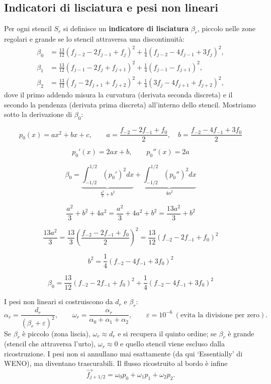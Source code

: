 \documentclass[12pt]{article}
\begin{document}
\newpage

\subsection{Indicatori di lisciatura e pesi non lineari}

Per ogni stencil $S_r$ si definisce un \textbf{indicatore di lisciatura} $\beta_r$, piccolo nelle zone regolari e grande se lo stencil attraversa una discontinuità:
\[
\begin{aligned}
\beta_0 &= \tfrac{13}{12}(f_{j-2}-2f_{j-1}+f_j)^2 + \tfrac14(f_{j-2}-4f_{j-1}+3f_j)^2, \\
\beta_1 &= \tfrac{13}{12}(f_{j-1}-2f_j+f_{j+1})^2 + \tfrac14(f_{j-1}-f_{j+1})^2, \\
\beta_2 &= \tfrac{13}{12}(f_j-2f_{j+1}+f_{j+2})^2 + \tfrac14(3f_j-4f_{j+1}+f_{j+2})^2,
\end{aligned}
\]
dove il primo addendo misura la curvatura (derivata seconda discreta) e il secondo la pendenza (derivata prima discreta) all'interno dello stencil. Mostriamo sotto la derivazione di $\beta_0$:
\newline

\[
p_0(x)=ax^2+bx+c,\qquad 
a=\frac{f_{-2}-2f_{-1}+f_0}{2},\quad
b=\frac{f_{-2}-4f_{-1}+3f_0}{2}
\]

\[
p_0'(x)=2ax+b,\qquad p_0''(x)=2a
\]

\[
\beta_0 = \underbrace{\int_{-1/2}^{1/2} (p_0')^2 dx}_{\displaystyle \frac{a^2}{3}+b^2}
      + \underbrace{\int_{-1/2}^{1/2} (p_0'')^2 dx}_{\displaystyle 4a^2}
\]

\[
\frac{a^2}{3}+b^2+4a^2
= \frac{a^2}{3}+4a^2+b^2
= \frac{13a^2}{3}+b^2
\]

\[
\frac{13a^2}{3} = \frac{13}{3}\left(\frac{f_{-2}-2f_{-1}+f_0}{2}\right)^2
= \frac{13}{12}(f_{-2}-2f_{-1}+f_0)^2
\]

\[
b^2 = \frac{1}{4}(f_{-2}-4f_{-1}+3f_0)^2
\]

\[
\beta_0 = \frac{13}{12}(f_{-2}-2f_{-1}+f_0)^2 + \frac{1}{4}(f_{-2}-4f_{-1}+3f_0)^2
\]



I pesi non lineari si costruiscono da $d_r$ e $\beta_r$:
\[
\alpha_r = \frac{d_r}{(\beta_r+\varepsilon)^2}, \qquad \omega_r=\frac{\alpha_r}{\alpha_0+\alpha_1+\alpha_2}, \qquad \varepsilon=10^{-6}\ (\text{evita la divisione per zero}).
\]
Se $\beta_r$ è piccolo (zona liscia), $\omega_r\approx d_r$ e si recupera il quinto ordine; se $\beta_r$ è grande (stencil che attraversa l'urto), $\omega_r\approx0$ e quello stencil viene escluso dalla ricostruzione. I pesi non si annullano mai esattamente (da qui `Essentially' di WENO), ma diventano trascurabili. Il flusso ricostruito al bordo è infine
\[
\hat f^+_{j+1/2} = \omega_0p_0+\omega_1p_1+\omega_2p_2.
\]
\end{document}
